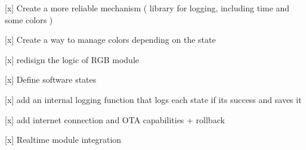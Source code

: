 
\begin{DoxyItemize}
\item \mbox{[}x\mbox{]} Create a more reliable mechanism ( library for logging, including time and some colors )
\item \mbox{[}x\mbox{]} Create a way to manage colors depending on the state
\item \mbox{[}x\mbox{]} redisign the logic of RGB module
\item \mbox{[}x\mbox{]} Define software states
\item \mbox{[}x\mbox{]} add an internal logging function that logs each state if its success and saves it
\item \mbox{[}x\mbox{]} add internet connection and OTA capabilities + rollback
\item \mbox{[}x\mbox{]} Realtime module integration 
\end{DoxyItemize}